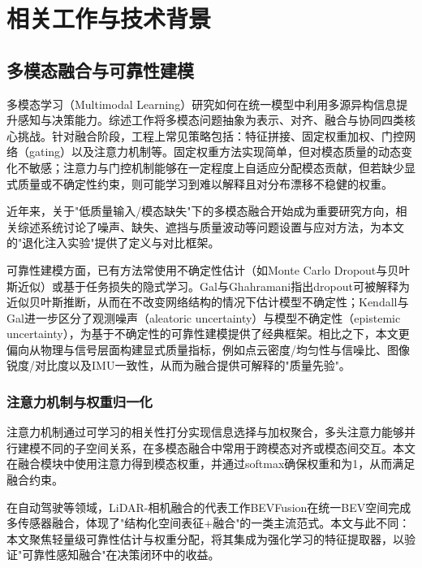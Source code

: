 \chapter{相关工作与技术背景}

\section{多模态融合与可靠性建模}
多模态学习（Multimodal Learning）研究如何在统一模型中利用多源异构信息提升感知与决策能力。综述工作\cite{baltrusaitis2017multimodalmachinelearningsurvey}将多模态问题抽象为表示、对齐、融合与协同四类核心挑战。针对融合阶段，工程上常见策略包括：特征拼接、固定权重加权、门控网络（gating）以及注意力机制等。固定权重方法实现简单，但对模态质量的动态变化不敏感；注意力与门控机制能够在一定程度上自适应分配模态贡献，但若缺少显式质量或不确定性约束，则可能学习到难以解释且对分布漂移不稳健的权重。

近年来，关于"低质量输入/模态缺失"下的多模态融合开始成为重要研究方向，相关综述\cite{zhang2024multimodalfusionlowqualitydata}系统讨论了噪声、缺失、遮挡与质量波动等问题设置与应对方法，为本文的"退化注入实验"提供了定义与对比框架。

可靠性建模方面，已有方法常使用不确定性估计（如Monte Carlo Dropout与贝叶斯近似）或基于任务损失的隐式学习。Gal与Ghahramani\cite{gal2016dropoutbayesian}指出dropout可被解释为近似贝叶斯推断，从而在不改变网络结构的情况下估计模型不确定性；Kendall与Gal\cite{kendall2017uncertainties}进一步区分了观测噪声（aleatoric uncertainty）与模型不确定性（epistemic uncertainty），为基于不确定性的可靠性建模提供了经典框架。相比之下，本文更偏向从物理与信号层面构建显式质量指标，例如点云密度/均匀性与信噪比、图像锐度/对比度以及IMU一致性，从而为融合提供可解释的"质量先验"。

\subsection{注意力机制与权重归一化}
注意力机制通过可学习的相关性打分实现信息选择与加权聚合，多头注意力\cite{vaswani2017attention}能够并行建模不同的子空间关系，在多模态融合中常用于跨模态对齐或模态间交互。本文在融合模块中使用注意力得到模态权重，并通过softmax确保权重和为1，从而满足融合约束。

在自动驾驶等领域，LiDAR-相机融合的代表工作BEVFusion\cite{liu2024bevfusionmultitaskmultisensorfusion}在统一BEV空间完成多传感器融合，体现了"结构化空间表征+融合"的一类主流范式。本文与此不同：本文聚焦轻量级可靠性估计与权重分配，将其集成为强化学习的特征提取器，以验证"可靠性感知融合"在决策闭环中的收益。

